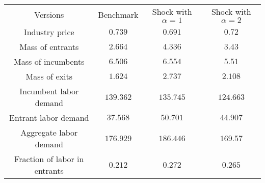 \begin{tabular}{cccc}
Versions & Benchmark & Shock with $\alpha = 1$ & Shock with $\alpha = 2$\\
Industry price & $0.739$ & $0.691$ & $0.72$\\
Mass of entrants & $2.664$ & $4.336$ & $3.43$\\
Mass of incumbents & $6.506$ & $6.554$ & $5.51$\\
Mass of exits & $1.624$ & $2.737$ & $2.108$\\
Incumbent labor demand & $139.362$ & $135.745$ & $124.663$\\
Entrant labor demand & $37.568$ & $50.701$ & $44.907$\\
Aggregate labor demand & $176.929$ & $186.446$ & $169.57$\\
Fraction of labor in entrants & $0.212$ & $0.272$ & $0.265$\\
\end{tabular}